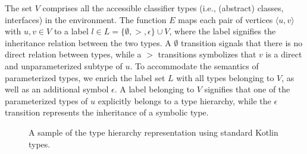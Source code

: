 The set $V$ comprises all the accessible classifier types
(i.e., (abstract) classes, interfaces) in the environment.
The function $E$ maps each pair of vertices $\langle u, v \rangle$ with $u, v \in V$
to a label $l \in L = \{ \emptyset, >, \epsilon \} \cup V$, where the label signifies
the inheritance relation between the two types.
A $\emptyset$ transition signals that there is no direct relation between types, while
a $>$ transitions symbolizes that $v$ is a direct and unparameterized subtype of $u$.
To accommodate the semantics of parameterized types, we enrich the label set $L$
with all types belonging to $V$, as well as an additional symbol $\epsilon$.
A label belonging to $V$ signifies that one of the parameterized types of $u$
explicitly belongs to a type hierarchy, while the $\epsilon$ transition represents
the inheritance of a symbolic type.

\begin{figure}
    \footnotesize
    \centering
    \caption{A sample of the type hierarchy representation using standard Kotlin types.}
    \label{fig:type-hierarchy}
\end{figure}


